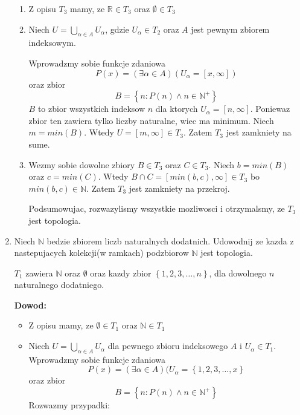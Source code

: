 \documentclass{article}
\begin{document}
\begin{enumerate}
\begin{enumerate}[label=(\alph*')]
            \item Z opisu $T_{3}$ mamy, ze $\mathbb{R} \in T_{3}$ oraz $\emptyset \in T_{3}$
            \item Niech $U = \bigcup\limits_{\alpha \in A}U_{\alpha}$, gdzie $U_{\alpha} \in T_{2}$ oraz $A$ jest pewnym zbiorem indeksowym.

                Wprowadzmy sobie funkcje zdaniowa $$P(x) = (\exists \alpha \in A)(U_{\alpha} = [x, \infty])$$
                oraz zbior
                $$B = \left\{n: P(n) \land n \in {\mathbb{N}}^{+}\right\}$$
                $B$ to zbior wszystkich indeksow $n$ dla ktorych $U_{\alpha} = [n, \infty]$.
                Poniewaz zbior ten zawiera tylko liczby naturalne, wiec ma minimum. Niech $m = min(B)$. Wtedy $U = [m, \infty] \in T_{3}$. Zatem $T_{3}$ jest zamkniety na sume.
            \item Wezmy sobie dowolne zbiory $B \in T_{3}$ oraz $C \in T_{3}$. Niech $b = min(B)$ oraz $c = min(C)$. Wtedy $B\cap C = [min(b,c), \infty] \in T_{3}$ bo $min(b,c) \in \mathbb{N}$. Zatem $T_{3}$ jest zamkniety na przekroj.

                Podsumowujac, rozwazylismy wszystkie mozliwosci i otrzymalsmy, ze $T_{3}$ jest topologia.

        \end{enumerate} %

    \item Niech $\mathbb{N}$ bedzie zbiorem liczb naturalnych dodatnich. Udowodnij ze kazda z nastepujacych kolekcji(w ramkach) podzbiorow $\mathbb{N}$ jest topologia.

        \begin{tcolorbox}[colback=white!90!red,colframe=black!35!red,title=Definicja: \textbf{Initial segment topology}; poki co brak polskiego tlumaczenia]
            $T_{1}$ zawiera $\mathbb{N}$ oraz $\emptyset$ oraz kazdy zbior $\left\{1,2,3,\dots,n\right\}$, dla dowolnego $n$ naturalnego dodatniego.
        \end{tcolorbox}
        \textbf{Dowod:}

        \begin{itemize}%

            \item Z opisu mamy, ze $\emptyset \in T_{1}$ oraz $\mathbb{N} \in T_{1}$
            \item Niech $U = \bigcup\limits_{\alpha \in A}U_{\alpha}$ dla pewnego zbioru indeksowego $A$ i $U_{\alpha} \in T_{1}$. Wprowadzmy sobie funkcje zdaniowa
                $$P(x) = (\exists \alpha \in A)(U_{\alpha} = \left\{1,2,3,\dots,x\right\}$$
                oraz zbior
                $$B = \left\{n: P(n) \land n \in {\mathbb{N}}^{+}\right\}$$
                Rozwazmy przypadki:
                \begin{itemize}%


\end{itemize}
\end{itemize}
\end{enumerate}
\end{document}
